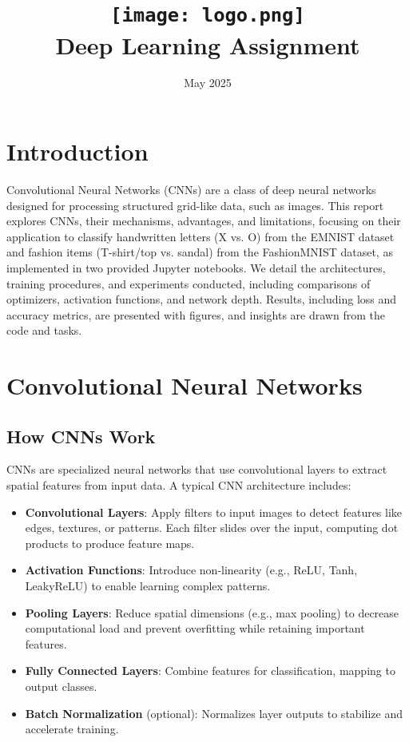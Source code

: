 \documentclass{article}
\title{
    \texttt{[image: logo.png]} \\
    Deep Learning Assignment \\ \exerciseset
}
\author{\FirstAuthor}
\date{May 2025}
\begin{document}
\maketitle

\section{Introduction}
Convolutional Neural Networks (CNNs) are a class of deep neural networks designed for processing structured grid-like data, such as images. This report explores CNNs, their mechanisms, advantages, and limitations, focusing on their application to classify handwritten letters (X vs. O) from the EMNIST dataset and fashion items (T-shirt/top vs. sandal) from the FashionMNIST dataset, as implemented in two provided Jupyter notebooks. We detail the architectures, training procedures, and experiments conducted, including comparisons of optimizers, activation functions, and network depth. Results, including loss and accuracy metrics, are presented with figures, and insights are drawn from the code and tasks.

\section{Convolutional Neural Networks}
\subsection{How CNNs Work}
CNNs are specialized neural networks that use convolutional layers to extract spatial features from input data. A typical CNN architecture includes:

\begin{itemize}
    \item \textbf{Convolutional Layers}: Apply filters to input images to detect features like edges, textures, or patterns. Each filter slides over the input, computing dot products to produce feature maps.
    \item \textbf{Activation Functions}: Introduce non-linearity (e.g., ReLU, Tanh, LeakyReLU) to enable learning complex patterns.
    \item \textbf{Pooling Layers}: Reduce spatial dimensions (e.g., max pooling) to decrease computational load and prevent overfitting while retaining important features.
    \item \textbf{Fully Connected Layers}: Combine features for classification, mapping to output classes.
    \item \textbf{Batch Normalization} (optional): Normalizes layer outputs to stabilize and accelerate training.
\end{itemize}
\end{document}
